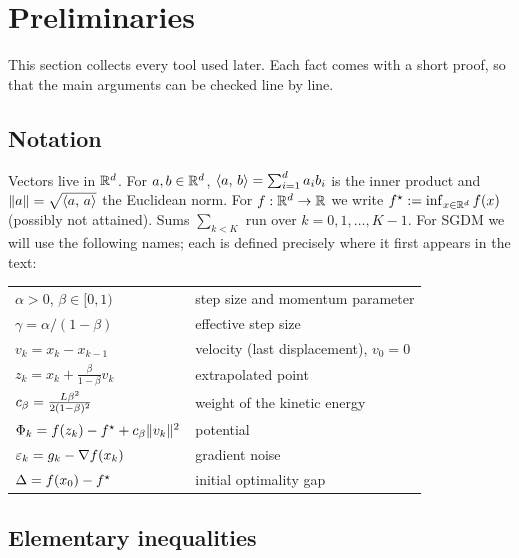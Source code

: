 \section{Preliminaries}\label{sec:prelim}

This section collects every tool used later. Each fact comes with a short proof, so that
the main arguments can be checked line by line.

\subsection{Notation}

Vectors live in $\mathbb{R}^d$. For $a,b\in\mathbb{R}^d$, $\langle a,\, b\rangle=\sum_{i=1}^d a_ib_i$ is the inner
product and $\lVert a\rVert=\sqrt{\langle a,\, a\rangle}$ the Euclidean norm. For $f:\mathbb{R}^d\to\mathbb{R}$ we write
$f^\star:=\inf_{x\in\mathbb{R}^d}f(x)$ (possibly not attained). Sums $\sum_{k<K}$ run over
$k=0,1,\dots,K-1$. For SGDM we will use the following names; each is defined precisely where it first
appears in the text:
\begin{center}\small
\begin{tabular}{@{}ll@{}}
\toprule
$\alpha>0$, $\beta\in[0,1)$ & step size and momentum parameter\\
$\gamma=\alpha/(1-\beta)$ & effective step size\\
$v_k=x_k-x_{k-1}$ & velocity (last displacement), $v_0=0$\\
$z_k=x_k+\frac{\beta}{1-\beta}v_k$ & extrapolated point\\
$c_\beta=\frac{L\beta^2}{2(1-\beta)^2}$ & weight of the kinetic energy\\
$\Phi_k=f(z_k)-f^\star+c_\beta\lVert v_k\rVert^2$ & potential\\
$\varepsilon_k=g_k-\nabla f(x_k)$ & gradient noise\\
$\Delta=f(x_0)-f^\star$ & initial optimality gap\\
\bottomrule
\end{tabular}
\end{center}

\subsection{Elementary inequalities}

